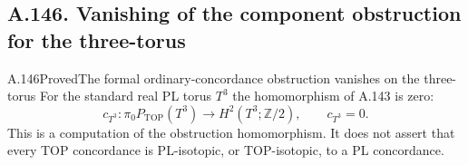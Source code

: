 \subsection{A.146. Vanishing of the component obstruction for the three-torus}

\begin{saresult}{A.146}{Proved}{The formal ordinary-concordance obstruction vanishes on the three-torus}
For the standard real PL torus $T^3$ the homomorphism of A.143 is zero:
\[
             c_{T^3}:\pi_0P_{\mathrm{TOP}}(T^3)
                         \longrightarrow H^2(T^3;\mathbb Z/2),
             \qquad c_{T^3}=0.
 \tag{146.1}
\]
This is a computation of the obstruction homomorphism. It does not
assert that every TOP concordance is PL-isotopic, or TOP-isotopic,
to a PL concordance.
\end{saresult}


